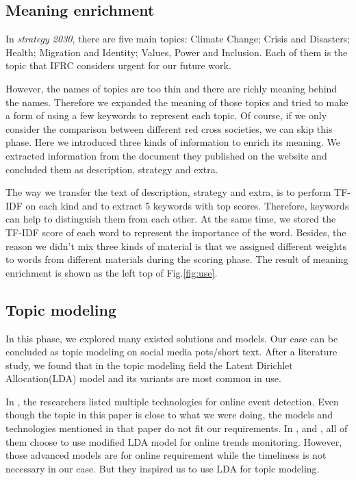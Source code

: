 \documentclass[sigchi]{acmart}
\begin{document}
\subsection{Meaning enrichment}\label{sec:Meaning enrichment}

In \textit{strategy 2030}, there are five main topics: Climate Change; Crisis and Disasters; Health; Migration and Identity; Values, Power and Inclusion. Each of them is the topic that IFRC considers urgent for our future work.

However, the names of topics are too thin and there are richly meaning behind the names. Therefore we expanded the meaning of those topics and tried to make a form of using a few keywords to represent each topic. Of course, if we only consider the comparison between different red cross societies, we can skip this phase. Here we introduced three kinds of information to enrich its meaning. We extracted information from the document they published on the website and concluded them as description, strategy and extra.

The way we transfer the text of description, strategy and extra, is to perform TF-IDF on each kind and to extract 5 keywords with top scores. 
Therefore, keywords can help to distinguish them from each other. At the same time, we stored the TF-IDF score of each word to represent the importance of the word. Besides, the reason we didn't mix three kinds of material is that we assigned different weights to words from different materials during the scoring phase. The result of meaning enrichment is shown as the left top of Fig.\ref{fig:use}.

\subsection{Topic modeling}\label{sec:Topic modeling}
In this phase, we explored many existed solutions and models. Our case can be concluded as topic modeling on social media pots/short text. After a literature study, we found that in the topic modeling field the Latent Dirichlet Allocation(LDA) model and its variants are most common in use. 

In \cite{Farzindar2015}, the researchers listed multiple technologies for online event detection. Even though the topic in this paper is close to what we were doing, the models and technologies mentioned in that paper do not fit our requirements. In \cite{Wang2012},\cite{Lau2012} and \cite{Sasaki2014}, all of them choose to use modified LDA model for online trends monitoring. However, those advanced models are for online requirement while the timeliness is not necessary in our case. But they inspired us to use LDA for topic modeling.
\end{document}
